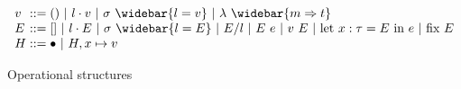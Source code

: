 \documentclass[sigplan]{acmart}
\theoremstyle{definition}
\begin{document}
\begin{figure*}[h]
\[
  \begin{array}{l @{} l}
    v 
    &{} ::=
    \begin{array}[t]{@{} l}
      () 
      \ |\ 
      l \cdot v
      \ |\ 
      \sigma\ \widebar{l = v}
      \ |\ 
      \lambda\ \widebar{m \Rightarrow t} 
    \end{array}
    \\
    E 
    &{} ::=
    []
    \ |\ 
    l \cdot E 
    \ |\ 
    \sigma\ \widebar{l = E}
    \ |\ 
    E/l
    \ |\ 
    E\ e 
    \ |\ 
    v\ E
    \ |\ 
    \text{let } x : \tau = E\ \text{in}\ e 
    \ |\ 
    \text{fix } E 
    \\
    H 
    &{} ::=
    \bullet
    \ |\ 
    H, x \mapsto v
  \end{array}
\]
\caption{Operational structures}
\end{figure*}
  




  
\end{document}
